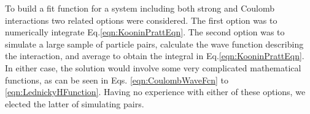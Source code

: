 \documentclass[ALICE,manyauthors]{cernphprep}
\newcommand{\ResultsDirBase}{/home/jesse/Analysis/FemtoAnalysis/Results/}
\newcommand{\Lam}{$\Lambda$\xspace}
\newcommand{\LamKchP}{$\Lambda\mathrm{K^{+}}$\xspace}
\begin{document}
To build a fit function for a system including both strong and Coulomb interactions two related options were considered. 
The first option was to numerically integrate Eq.\ref{eqn:KooninPrattEqn}.  
The second option was to simulate a large sample of particle pairs, calculate the wave function describing the interaction, and average to obtain the integral in Eq.\ref{eqn:KooninPrattEqn}. 
In either case, the solution would involve some very complicated mathematical functions, as can be seen in Eqs. \ref{eqn:CoulombWaveFcn} to \ref{eqn:LednickyHFunction}.
Having no experience with either of these options, we elected the latter of simulating pairs. 



\begin{comment}
\section{Spherical Harmonic Decomposition}
\label{app:SphericalHarmonics}


In Fig. \ref{fig:LamKchP_ReC00C11_0010} results are shown for the $C_{00}$ and $\Re C_{11}$ components from the spherical decomposition of our \LamKchP system in the 0--10\% centrality bin.
As seen in the figure, the $C_{00}$ signal is similar to that observed in the one-dimensional study.
The $\Re C_{11}$ component shows a clear deviation from zero, and the negative value signifies that the \Lam particles are, on average, emitted further out and/or earlier than the K mesons.


\begin{figure}[h!]
  \centering
  \texttt{[image: \\ResultsDirBase Results\_cLamcKch\_20181205/SphericalHarmonics/LamKchP/CanCfYlmReC00C11\_LamKchPALamKchM\_0010.pdf]}
  \caption[\LamKchP $C_{00}$ and $\Re C_{11}$ Spherical Harmonic Components (0--10\%)]{$C_{00}$ (left) and $\Re C_{11}$ (right) components of a spherical harmonic decomposition of the \LamKchP correlation function for the 0--10\% centrality bin.  
The $C_{00}$ component is similar to the 1D correlation functions typically studied, and probes the overall size of the source.
The $\Re C_{11}$ component probes the asymmetry in the system; a non-zero value reveals the asymmetry}
  \label{fig:LamKchP_ReC00C11_0010}
\end{figure}
\end{comment}
\end{document}
